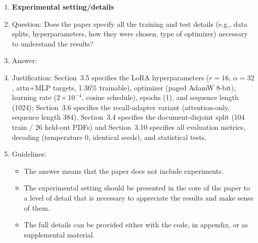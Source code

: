 \begin{enumerate}
\item {\bf Experimental setting/details}
    \item[] Question: Does the paper specify all the training and test details (e.g., data splits, hyperparameters, how they were chosen, type of optimizer) necessary to understand the results?
    \item[] Answer: \answerYes{}
    \item[] Justification: Section~3.5 specifies the LoRA hyperparameters ($r{=}16$, $\alpha{=}32$, attn+MLP targets, 1.36\% trainable), optimizer (paged AdamW 8-bit), learning rate ($2\times10^{-4}$, cosine schedule), epochs (1), and sequence length (1024); Section~3.6 specifies the recall-adapter variant (attention-only, sequence length 384). Section~3.4 specifies the document-disjoint split (104 train / 26 held-out PDFs) and Section~3.10 specifies all evaluation metrics, decoding (temperature 0, identical seeds), and statistical tests.
    \item[] Guidelines:
    \begin{itemize}
        \item The answer \answerNA{} means that the paper does not include experiments.
        \item The experimental setting should be presented in the core of the paper to a level of detail that is necessary to appreciate the results and make sense of them.
        \item The full details can be provided either with the code, in appendix, or as supplemental material.
    \end{itemize}


\end{enumerate}
